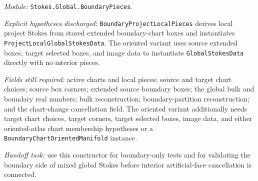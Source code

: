 \begin{definition}
  \label{anc:m6_boundary_piece_constructors}
  \leanok
  \emph{Module:} \texttt{Stokes.Global.BoundaryPieces}.

  \emph{Explicit hypotheses discharged:}
  \texttt{BoundaryProjectLocalPieces} derives local project Stokes from stored
  extended boundary-chart boxes and instantiates
  \texttt{ProjectLocalGlobalStokesData}.  The oriented variant uses source
  extended boxes, target selected boxes, and image data to instantiate
  \texttt{GlobalStokesData} directly with no interior pieces.

  \emph{Fields still required:}
  active charts and local pieces; source and target chart choices; source box
  corners; extended source boundary boxes; the global bulk and boundary real
  numbers; bulk reconstruction; boundary-partition reconstruction; and the
  chart-change cancellation field.  The oriented variant additionally needs
  target chart choices, target corners, target selected boxes, image data, and
  either oriented-atlas chart membership hypotheses or a
  \texttt{BoundaryChartOrientedManifold} instance.

  \emph{Handoff task:}
  use this constructor for boundary-only tests and for validating the boundary
  side of mixed global Stokes before interior artificial-face cancellation is
  connected.
\end{definition}

